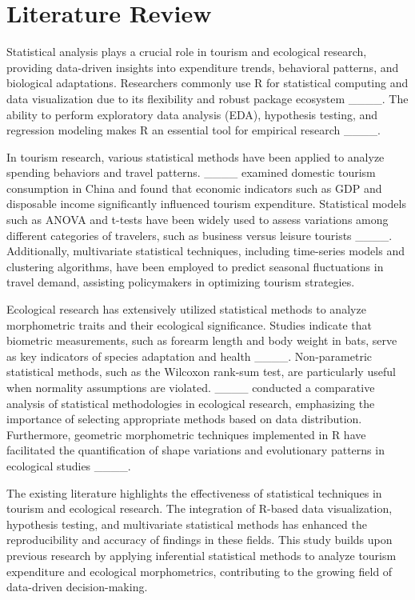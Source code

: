 \section{Literature Review}
Statistical analysis plays a crucial role in tourism and ecological research, providing data-driven insights into expenditure trends, behavioral patterns, and biological adaptations. Researchers commonly use R for statistical computing and data visualization due to its flexibility and robust package ecosystem ____. The ability to perform exploratory data analysis (EDA), hypothesis testing, and regression modeling makes R an essential tool for empirical research ____.

In tourism research, various statistical methods have been applied to analyze spending behaviors and travel patterns. ____ examined domestic tourism consumption in China and found that economic indicators such as GDP and disposable income significantly influenced tourism expenditure. Statistical models such as ANOVA and t-tests have been widely used to assess variations among different categories of travelers, such as business versus leisure tourists ____. Additionally, multivariate statistical techniques, including time-series models and clustering algorithms, have been employed to predict seasonal fluctuations in travel demand, assisting policymakers in optimizing tourism strategies.

Ecological research has extensively utilized statistical methods to analyze morphometric traits and their ecological significance. Studies indicate that biometric measurements, such as forearm length and body weight in bats, serve as key indicators of species adaptation and health ____. Non-parametric statistical methods, such as the Wilcoxon rank-sum test, are particularly useful when normality assumptions are violated. ____ conducted a comparative analysis of statistical methodologies in ecological research, emphasizing the importance of selecting appropriate methods based on data distribution. Furthermore, geometric morphometric techniques implemented in R have facilitated the quantification of shape variations and evolutionary patterns in ecological studies ____.

The existing literature highlights the effectiveness of statistical techniques in tourism and ecological research. The integration of R-based data visualization, hypothesis testing, and multivariate statistical methods has enhanced the reproducibility and accuracy of findings in these fields. This study builds upon previous research by applying inferential statistical methods to analyze tourism expenditure and ecological morphometrics, contributing to the growing field of data-driven decision-making.

